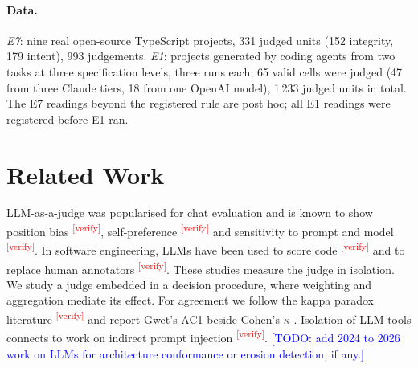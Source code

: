 \documentclass[10pt,a4paper]{article}
\newcommand{\citeneeded}[1]{\cite{#1}\textsuperscript{\textcolor{red}{\tiny[verify]}}}
\newcommand{\todo}[1]{\textcolor{blue}{[TODO: #1]}}
\begin{document}
\paragraph{Data.}
\emph{E7}: nine real open-source TypeScript projects, 331 judged units (152 integrity, 179 intent), 993 judgements.
\emph{E1}: projects generated by coding agents from two tasks at three specification levels, three runs each; 65
valid cells were judged (47 from three Claude tiers, 18 from one OpenAI model), 1\,233 judged units in total.
The E7 readings beyond the registered rule are post hoc; all E1 readings were registered before E1 ran.

\section{Related Work}\label{sec:related}

LLM-as-a-judge was popularised for chat evaluation \cite{zheng2023judging} and is known to show position bias
\citeneeded{wang2023fair}, self-preference \citeneeded{panickssery2024self,wataoka2024selfpref} and sensitivity to
prompt and model \citeneeded{thakur2024judging}. In software engineering, LLMs have been used to score code
\citeneeded{zhuo2024icescore} and to replace human annotators \citeneeded{ahmed2025annotation}. These studies
measure the judge in isolation. We study a judge embedded in a decision procedure, where weighting and aggregation
mediate its effect. For agreement we follow the kappa paradox literature \cite{feinstein1990high}\citeneeded{byrt1993bias}
and report Gwet's AC1 \cite{gwet2008ac1} beside Cohen's $\kappa$ \cite{cohen1960}. Isolation of LLM tools connects
to work on indirect prompt injection \citeneeded{greshake2023injection}.
\todo{add 2024 to 2026 work on LLMs for architecture conformance or erosion detection, if any.}
\end{document}
